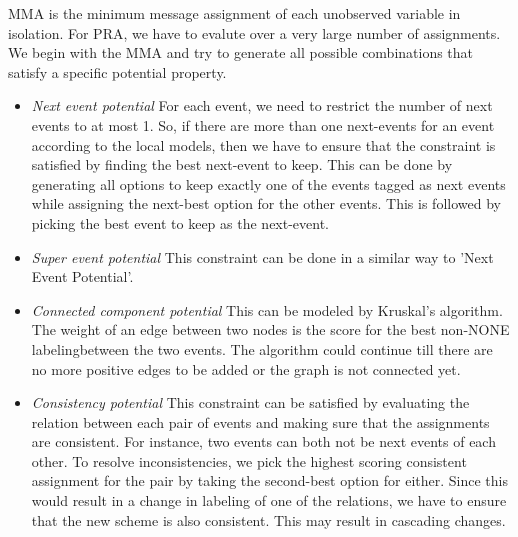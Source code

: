 MMA is the minimum message assignment of each unobserved variable in isolation. For PRA, we have to evalute over a very large number of assignments. We begin with the MMA and try to generate all possible combinations that satisfy a specific potential property. 

\begin{itemize}
\item {\em Next event potential} For each event, we need to restrict the number of next events to at most 1. So, if there are more than one next-events for an event according to the local models, then we have to ensure that the constraint is satisfied by finding the best next-event to keep. This can be done by generating all options to keep exactly one of the events tagged as next events while assigning the next-best option for the other events. This is followed by picking the best event to keep as the next-event.
\item {\em Super event potential} This constraint can be done in a similar way to 'Next Event Potential'.
\item {\em Connected component potential} This can be modeled by Kruskal's algorithm. The weight of an edge between two nodes is the score for the best non-NONE labelingbetween the two events. The algorithm could continue till there are no more positive edges to be added or the graph is not connected yet. 
\item {\em Consistency potential} This constraint can be satisfied by evaluating the relation between each pair of events and making sure that the assignments are consistent. For instance, two events can both not be next events of each other. To resolve inconsistencies, we pick the highest scoring consistent assignment for the pair by taking the second-best option for either. Since this would result in a change in labeling of one of the relations, we have to ensure that the new scheme is also consistent. This may result in cascading changes.
\end{itemize}


